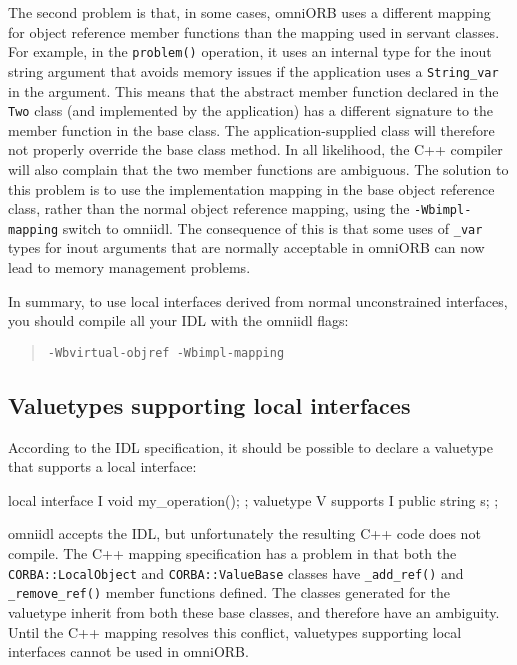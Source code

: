 \documentclass[11pt,oneside,a4paper]{book}
\newcommand{\type}[1]{\texttt{#1}}
\newcommand{\code}[1]{\texttt{#1}}
\newcommand{\op}[1]{\texttt{#1()}}
\newcommand{\cmdline}[1]{\texttt{#1}}
\newcommand{\dsc}{\discretionary{}{}{}}
\begin{document}
The second problem is that, in some cases, omniORB uses a different
mapping for object reference member functions than the mapping used in
servant classes. For example, in the \op{problem} operation, it uses
an internal type for the inout string argument that avoids memory
issues if the application uses a \type{String\_var} in the argument.
This means that the abstract member function declared in the
\type{Two} class (and implemented by the application) has a different
signature to the member function in the base class. The
application-supplied class will therefore not properly override the
base class method. In all likelihood, the C++ compiler will also
complain that the two member functions are ambiguous. The solution to
this problem is to use the implementation mapping in the base object
reference class, rather than the normal object reference mapping,
using the \cmdline{-Wbimpl-mapping} switch to omniidl. The consequence
of this is that some uses of \code{\_var} types for inout arguments
that are normally acceptable in omniORB can now lead to memory
management problems.

In summary, to use local interfaces derived from normal unconstrained
interfaces, you should compile all your IDL with the omniidl flags:

\begin{quote}
\cmdline{-Wbvirtual-objref -Wbimpl-mapping}
\end{quote}


\subsection{Valuetypes supporting local interfaces}

According to the IDL specification, it should be possible to declare a
valuetype that supports a local interface:

\begin{idllisting}
local interface I {
  void my_operation();
};
valuetype V supports I {
  public string s;
};
\end{idllisting}

omniidl accepts the IDL, but unfortunately the resulting C++ code does
not compile. The C++ mapping specification has a problem in that both
the \type{CORBA::\dsc{}LocalObject} and \type{CORBA::ValueBase}
classes have \op{\_add\_ref} and \op{\_remove\_\dsc{}ref} member
functions defined. The classes generated for the valuetype inherit
from both these base classes, and therefore have an ambiguity. Until
the C++ mapping resolves this conflict, valuetypes supporting local
interfaces cannot be used in omniORB.
\end{document}

